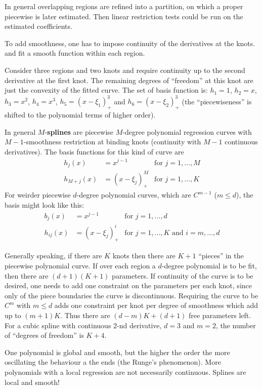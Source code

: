 \documentclass[a4paper]{article}
\begin{document}
In general overlapping regions are refined into a partition, on which a proper
piecewise is later estimated. Then linear restriction tests could be run on the
estimated coefficients.

To add smoothness, one has to impose continuity of the derivatives at the knots.
and fit a smooth function within each region.

Consider three regions and two knots and require continuity up to the second
derivative at the first knot. The remaining degrees of ``freedom'' at this knot
are just the convexity of the fitted curve. The set of basis function is:
$h_1 = 1$, $h_2 = x$, $h_3 = x^2$, $h_4 = x^3$,
$h_5 = (x-\xi_1)_+^3$ and $h_6 = (x-\xi_2)_+^3$ (the ``piecewiseness'' is shifted
to the polynomial terms of higher order).

In general $M$-\textbf{splines} are piecewise $M$-degree polynomial regression
curves with $M-1$-smoothness restriction at binding knots (continuity with $M-1$
continuous derivatives). The basis functions for this kind of curve are
\begin{align*}
	h_j(x) &= x^{j-1}&\text{for }j=1,\ldots, M\\
	h_{M+j}(x) &= (x-\xi_j)_+^M &\text{for }j=1,\ldots,K
\end{align*}
For weirder piecewise $d$-degree polynomial curves, which are $C^{m-1}$ ($m\leq d$),
the basis might look like this:
\begin{align*}
	b_j(x) &= x^{j-1}&\text{for }j=1,\ldots, d\\
	h_{ij}(x) &= (x-\xi_j)_+^i &\text{for } j=1,\ldots,K\text{ and } i=m,\ldots,d
\end{align*}

Generally speaking, if there are $K$ knots then there are $K+1$ ``pieces'' in the
piecewise polynomial curve. If over each region a $d$-degree polynomial is to be
fit, then there are $(d+1)(K+1)$ parameters. If continuity of the curve is to be
desired, one needs to add one constraint on the parameters per each knot, since only
of the piece boundaries the curve is discontinuous. Requiring the curve to be $C^m$
with $m\leq d$ adds one constraint per knot per degree of smoothness which add up
to $(m+1) K$. Thus there are $(d-m)K + (d+1)$ free parameters left. For a cubic
spline with continuous $2$-nd derivative, $d=3$ and $m=2$, the number of ``degrees
of freedom'' is $K+4$.

One polynomial is global and smooth, but the higher the order the more oscillating
the behaviour a the ends (the Runge's phenomenon). More polynomials with a local
regression are not necessarily continuous. Splines are local and smooth!
\end{document}
